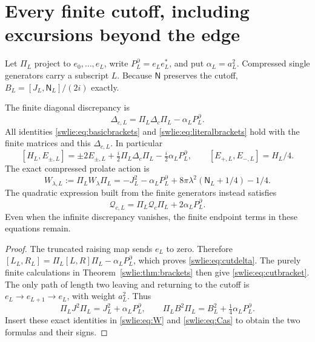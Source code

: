 \documentclass[11pt]{article}
\begin{document}
\section{Every finite cutoff, including excursions beyond the edge}

Let $\Pi_L$ project to $e_0,\ldots,e_L$, write
$P_L^\partial=e_Le_L^*$, and put $\alpha_L=a_L^2$.
Compressed single generators carry a subscript $L$.
Because $\mathsf N$ preserves the cutoff,
$B_L=[J_L,\mathsf N_L]/(2i)$ exactly.

\begin{swlietheorem}\label{swlie:thm:cutoff}
The finite diagonal discrepancy is
\begin{equation}\label{swlie:eq:cutdelta}
 \Delta_{c,L}=\Pi_L\Delta_c\Pi_L-\alpha_LP_L^\partial.
\end{equation}
All identities \eqref{swlie:eq:basicbrackets} and
\eqref{swlie:eq:literalbrackets} hold with the finite matrices and
this $\Delta_{c,L}$. In particular
\begin{equation}\label{swlie:eq:cutbracket}
 [H_L,E_{\pm,L}]
 =\pm2E_{\pm,L}+\tfrac i2\Pi_L\Delta_c\Pi_L
                         -\tfrac i2\alpha_LP_L^\partial,
 \qquad [E_{+,L},E_{-,L}]=H_L/4.
\end{equation}
The exact compressed prolate action is
\begin{equation}\label{swlie:eq:cutprolate}
 \boxed{\quad
 W_{\lambda,L}:=\Pi_LW_\lambda\Pi_L
 =-J_L^2-\alpha_LP_L^\partial
        +8\pi\lambda^2(\mathsf N_L+1/4)-1/4.\quad}
\end{equation}
The quadratic expression built from the finite generators
instead satisfies
\begin{equation}\label{swlie:eq:cutcas}
 \mathcal Q_{c,L}=\Pi_L\mathcal Q_c\Pi_L
                                   +2\alpha_LP_L^\partial.
\end{equation}
Even when the infinite discrepancy vanishes,
the finite endpoint terms in these equations remain.
\end{swlietheorem}
\begin{proof}
The truncated raising map sends $e_L$ to zero.
Therefore $[L_L,R_L]=\Pi_L[L,R]\Pi_L-\alpha_LP_L^\partial$,
which proves \eqref{swlie:eq:cutdelta}. The purely finite
calculations in Theorem~\ref{swlie:thm:brackets} then give
\eqref{swlie:eq:cutbracket}. The only path of length two
leaving and returning to the cutoff is
$e_L\to e_{L+1}\to e_L$, with weight $a_L^2$.
Thus
\[
 \Pi_LJ^2\Pi_L=J_L^2+\alpha_LP_L^\partial,\qquad
 \Pi_LB^2\Pi_L=B_L^2+\tfrac14\alpha_LP_L^\partial.
\]
Insert these exact identities in \eqref{swlie:eq:W} and
\eqref{swlie:eq:Cas} to obtain the two formulas and their signs.
\end{proof}
\end{document}
